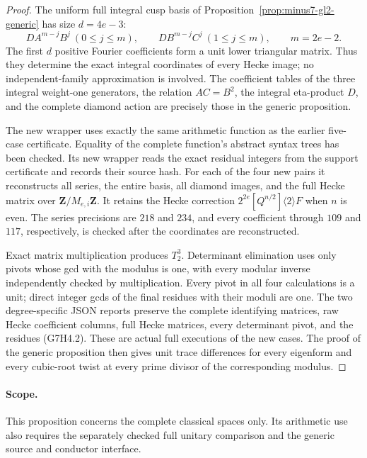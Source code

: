 \begin{proof}
The uniform full integral cusp basis of
Proposition~\ref{prop:minus7-gl2-generic} has size \(d=4e-3\):
\[
 DA^{m-j}B^j\ (0\le j\le m),\qquad
 DB^{m-j}C^j\ (1\le j\le m),\qquad m=2e-2.
\]
The first \(d\) positive Fourier coefficients form a unit lower
triangular matrix. Thus they determine the exact integral coordinates
of every Hecke image; no independent-family approximation is involved.
The coefficient tables of the three integral weight-one generators,
the relation \(AC=B^2\), the integral eta-product \(D\), and the
complete diamond action are precisely those in the generic proposition.

The new wrapper
uses exactly the same arithmetic function as the earlier five-case
certificate. Equality of the complete function's abstract syntax trees
has been checked. Its new wrapper reads the exact residual integers
from the support certificate and records their source hash.
For each of the four new pairs it reconstructs all series, the entire
basis, all diamond images, and the full Hecke matrix over
\(\mathbf Z/M_{e,i}\mathbf Z\). It retains the Hecke correction
\(2^{2e}[Q^{n/2}]\langle2\rangle F\) when \(n\) is even.
The series precisions are \(218\) and \(234\), and every coefficient
through \(109\) and \(117\), respectively, is checked after the
coordinates are reconstructed.

Exact matrix multiplication produces \(T_2^3\). Determinant
elimination uses only pivots whose gcd with the modulus is one,
with every modular inverse independently checked by multiplication.
Every pivot in all four calculations is a unit; direct integer gcds
of the final residues with their moduli are one. The two degree-specific
JSON reports preserve the complete identifying matrices, raw Hecke
coefficient columns, full Hecke matrices, every determinant pivot,
and the residues (G7H4.2). These are actual full executions of the
new cases. The proof of the generic proposition then gives unit
trace differences for every eigenform and every cubic-root twist
at every prime divisor of the corresponding modulus.
\end{proof}

\paragraph{Scope.}
This proposition concerns the complete classical spaces only.
Its arithmetic use also requires the separately checked full unitary
comparison and the generic source and conductor interface.
